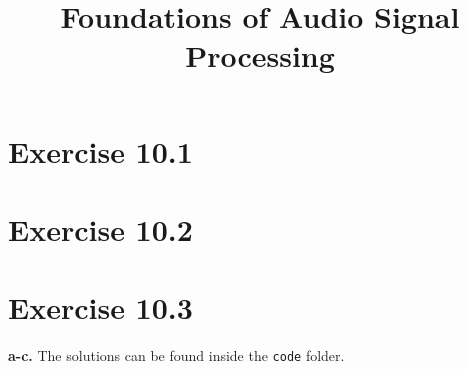 \documentclass[12pt]{article}
\title{Foundations of Audio Signal Processing\\ \ass}
\author{\auth}
\begin{document}
	\maketitle
	\section*{Exercise 10.1}
	\section*{Exercise 10.2}
	\section*{Exercise 10.3}
	\textbf{a-c.} The solutions can be found inside the \texttt{code} folder.
\end{document}
